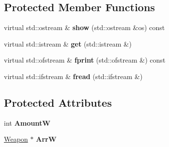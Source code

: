 \subsection*{Protected Member Functions}
\begin{DoxyCompactItemize}
\item 
\mbox{\label{class_aircraft_carrier_group_1_1_aircraft_carrier_a5d956c0217b7393e829e85caea6fb1fe}} 
virtual std\+::ostream \& {\bfseries show} (std\+::ostream \&os) const
\item 
\mbox{\label{class_aircraft_carrier_group_1_1_aircraft_carrier_a1bbf12101788a88387a7e76e6aa1e6b4}} 
virtual std\+::istream \& {\bfseries get} (std\+::istream \&)
\item 
\mbox{\label{class_aircraft_carrier_group_1_1_aircraft_carrier_a27d2e7f4970d513df2c50181c59921d1}} 
virtual std\+::ofstream \& {\bfseries fprint} (std\+::ofstream \&) const
\item 
\mbox{\label{class_aircraft_carrier_group_1_1_aircraft_carrier_a75f2144ae0faeda9cb7d9df10ff38487}} 
virtual std\+::ifstream \& {\bfseries fread} (std\+::ifstream \&)
\end{DoxyCompactItemize}
\subsection*{Protected Attributes}
\begin{DoxyCompactItemize}
\item 
\mbox{\label{class_aircraft_carrier_group_1_1_aircraft_carrier_a62dd633d643f869452c86196f739fa9a}} 
int {\bfseries AmountW}
\item 
\mbox{\label{class_aircraft_carrier_group_1_1_aircraft_carrier_a1922eb4020301c80903d841a65df1b92}} 
\mbox{\hyperlink{class_aircraft_carrier_group_1_1_weapon}{Weapon}} $\ast$ {\bfseries ArrW}
\end{DoxyCompactItemize}
